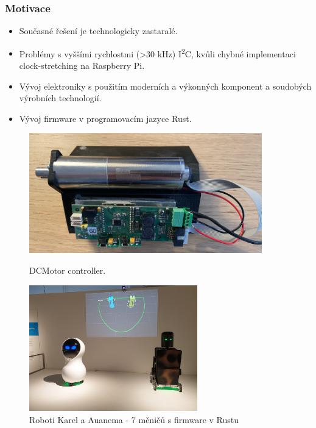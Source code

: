 \documentclass[%
  12pt,       				%
	t,                  %
	aspectratio=1610,   %
	unicode,						%
]{beamer}				    	%
\begin{document}
\begin{frame}
	\frametitle{Motivace}
	\begin{itemize}
		\item Současné řešení je technologicky zastaralé.
		\item Problémy s vyššími rychlostmi (>30 kHz) I\textsuperscript{2}C, kvůli chybné implementaci clock-stretching na Raspberry Pi.
		\item Vývoj elektroniky s použitím moderních a výkonných komponent a soudobých výrobních technologií.
		\item Vývoj firmware v programovacím jazyce Rust.
	\end{itemize}
	\begin{figure}[H]
		\begin{minipage}[t]{0.45\textwidth}
			\centering
			\includegraphics[angle=180,width=0.9\textwidth]{../Thesis/obrazky/dcmotor}
			\caption{DCMotor controller.}
			\label{fig:fliplink_orig}
		\end{minipage}\hfill
		\begin{minipage}[t]{0.45\textwidth}
			\centering
			\includegraphics[angle=180,width=0.65\textwidth]{../Thesis/obrazky/karlozo_auanemozo}
			\caption{Roboti Karel a Auanema - 7 měničů s firmware v Rustu}
			\label{fig:fliplink_changed}
		\end{minipage}
	\end{figure}
\end{frame}
\end{document}
